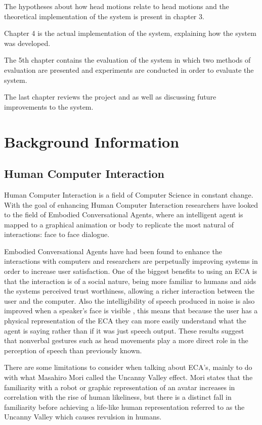 \documentclass[bsc,frontabs,twoside,singlespacing,parskip]{infthesis}
\begin{document}
The hypotheses about how head motions relate to head motions and the theoretical implementation of the system is present in chapter 3.

Chapter 4 is the actual implementation of the system, explaining how the system was developed.

The 5th chapter contains the evaluation of the system in which two methods of evaluation are presented and experiments are conducted in order to evaluate the system.

The last chapter reviews the project and as well as discussing future improvements to the system.



\chapter{Background Information}

\section{Human Computer Interaction}

Human Computer Interaction is a field of Computer Science in constant change. With the goal of enhancing Human Computer Interaction researchers have looked to the field of Embodied Conversational Agents, where an intelligent agent is mapped to a graphical animation or body to replicate the most natural of interactions: face to face dialogue. \cite{ecas} 

Embodied Conversational Agents have had been found to enhance the interactions with computers \cite{conv_agents} and researchers are perpetually improving systems in order to increase user satisfaction. One of the biggest benefits to using an ECA is that the interaction is of a social nature, being more familiar to humans and aids the systems perceived trust worthiness, allowing a richer interaction between the user and the computer. Also the intelligibility of speech produced in noise is also improved when a speaker's face is visible \cite{emotion_head_motion}, this means that because the user has a physical representation of the ECA they can more easily understand what the agent is saying rather than if it was just speech output. These results suggest that nonverbal gestures such as head movements play a more direct role in the perception of speech than previously known. \cite{vis_prosody}

There are some limitations to consider when talking about ECA's, mainly to do with what Masahiro Mori called the Uncanny Valley effect. Mori states that the familiarity with a robot or graphic representation of an avatar increases in correlation with the rise of human likeliness, but there is a distinct fall in familiarity before achieving a life-like human representation referred to as the Uncanny Valley which causes revulsion in humans. \cite{uncanny}
\end{document}
